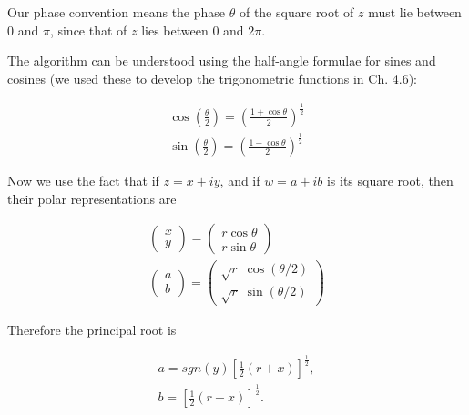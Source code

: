 Our phase convention means the phase $\theta$ of the square root of $z$ must lie between 0 and $\pi$, since that of $z$ lies between 0 and $2\pi$.

The algorithm can be understood using the half-angle formulae for sines and cosines (we used these to develop the trigonometric functions in Ch. 4.6):

\begin{equation}
  \begin{aligned}
    \cos\left(\frac{\theta}{2}\right) = \left(\frac{1+\cos\theta}{2}\right)^\frac{1}{2} \\
    \sin\left(\frac{\theta}{2}\right) = \left(\frac{1-\cos\theta}{2}\right)^\frac{1}{2}
  \end{aligned}
\end{equation}

Now we use the fact that if $z = x + iy$, and if $w = a + ib$ is its square root, then their polar representations are

\begin{equation}
  \begin{aligned}
    \begin{pmatrix}
      x \\
      y
    \end{pmatrix}
    =
    \begin{pmatrix}
      r \cos \theta \\
      r \sin \theta
    \end{pmatrix}
    \\
    \begin{pmatrix}
      a \\
      b
    \end{pmatrix}
    =
    \begin{pmatrix}
      \sqrt{r}\; \cos(\theta/2) \\
      \sqrt{r}\; \sin(\theta/2)
    \end{pmatrix}
  \end{aligned}
\end{equation}

Therefore the principal root is

\begin{equation}
  \begin{aligned}
  a = sgn(y) \left[\frac{1}{2}(r + x) \right] ^\frac{1}{2} ,\\
  b = \left[\frac{1}{2}(r - x) \right]^\frac{1}{2} .
  \end{aligned}
\end{equation}

